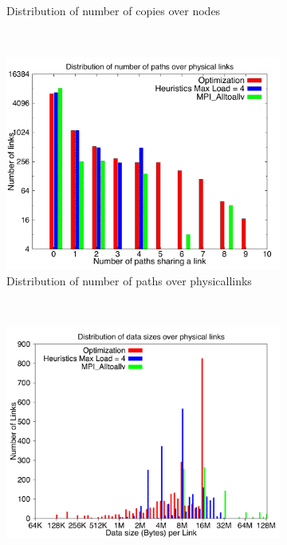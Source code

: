 \begin{figure}[!htbp]
\begin{subfigure}[b]{0.49\textwidth}
                \caption{Distribution of number of copies over nodes}
                \label{fig:27_1024_copy}
        \end{subfigure}
        ~ %
        \begin{subfigure}[b]{0.49\textwidth}
                \includegraphics[width=\textwidth]{report_figures/constantr/27_1024/loadpath_histo.pdf}
                \caption{Distribution of number of paths over physicallinks}
                \label{fig:27_1024_loadpath}
        \end{subfigure}
        ~ %
        \begin{subfigure}[b]{0.49\textwidth}
                \includegraphics[width=\textwidth]{report_figures/constantr/27_1024/loaddata_histo.pdf}

\end{subfigure}
\end{figure}
